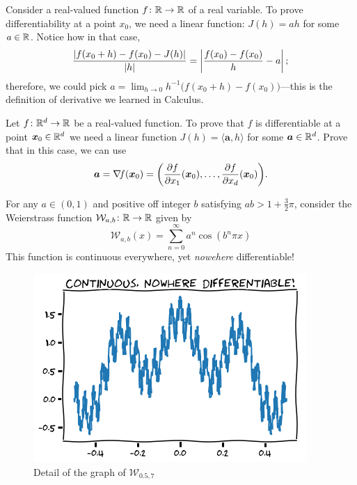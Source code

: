 \begin{example}\label{example:derivatives}
Consider a real-valued function $f\colon \mathbb{R} \to \mathbb{R}$ of a real variable. To prove differentiability at a point $x_0$, we need a linear function: $J(h)=ah$ for some $a\in \mathbb{R}$. Notice how in that case, 
\begin{equation*}
\frac{\lvert f(x_0+h)-f(x_0)-J(h) \rvert}{\lvert h \rvert} = \left\lvert \frac{f(x_0)-f(x_0)}{h} - a \right\lvert;
\end{equation*}
therefore, we could pick $a = \lim_{h\to 0} h^{-1}\big( f(x_0+h) - f(x_0) \big)$---this is the definition of derivative we learned in Calculus.
\end{example}

\begin{problem}\label{problem:gradient}
Let $f\colon \mathbb{R}^d \to \mathbb{R}$ be a real-valued function.  To prove that $f$ is differentiable at a point $\boldsymbol{x}_0 \in \mathbb{R}^d$ we need a linear function $J(h) = \langle \boldsymbol{a}, h \rangle$ for some $\boldsymbol{a} \in \mathbb{R}^d$.  Prove that in this case, we can use
\begin{equation*}
\boldsymbol{a} = \mathop{\nabla\! {f}}(\boldsymbol{x}_0)= \bigg( \frac{\partial f}{\partial x_1}(\boldsymbol{x}_0), \dotsc, \frac{\partial f}{\partial x_d}(\boldsymbol{x}_0) \bigg).
\end{equation*}
\end{problem}

\begin{example}\label{example:WeierstrassFunction}
For any $a \in (0,1)$ and positive off integer $b$ satisfying $ab > 1 + \tfrac{3}{2}\pi$, consider the Weierstrass function $\mathcal{W}_{a,b} \colon \mathbb{R} \to \mathbb{R}$ given by 
\begin{equation*}
\mathcal{W}_{a,b}(x) = \sum_{n=0}^\infty a^n \cos(b^n \pi x)
\end{equation*}
This function is continuous everywhere, yet \emph{nowehere} differentiable!
\begin{figure}[ht!]
\includegraphics[width=0.5\linewidth]{weierstrass.png}
\caption{Detail of the graph of $\mathcal{W}_{0.5, 7}$}
\end{figure}
\end{example}


